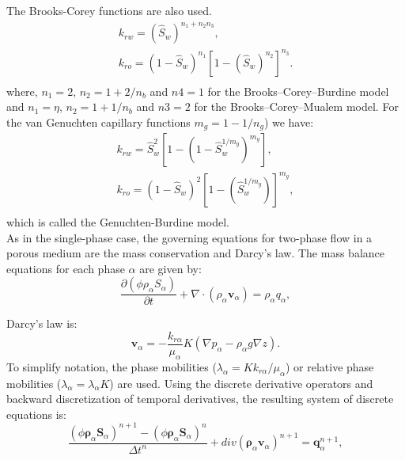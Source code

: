 \documentclass[a4paper,10pt]{report}
\begin{document}
The Brooks-Corey functions are also used. 
\begin{equation*}
\begin{aligned}
k_{rw}=(\hat{S}_w)^{n_1+n_2n_3},\\
k_{ro}=(1-\hat{S}_w)^{n_1}[1-(\hat{S}_w)^{n_2}]^{n_3}.\\
\end{aligned}
\end{equation*}
where, $n_1 = 2$, $n_2 = 1 + 2/n_b$ and $n4 = 1$ for the Brooks–Corey–Burdine model and $n_1 = \eta$, $n_2 = 1 + 1/n_b$ and $n3 = 2$ for the Brooks–Corey–Mualem model. For the van Genuchten capillary functions $m_g = 1 − 1/n_g$) we have:
\begin{equation*}
\begin{aligned}
k_{rw}=\hat{S}_w^2[1-(1-\hat{S}_w^{1/m_g})^{m_g}],\\
k_{ro}=(1-\hat{S}_w)^2[1-(\hat{S}_w^{1/m_g})]^{m_g},\\
\end{aligned}
\end{equation*}
which is called the Genuchten-Burdine model.\\
As in the single-phase case, the governing equations for two-phase flow in a porous medium are the mass 
conservation and Darcy's law. 
The mass balance equations for each phase $\alpha$ are given by:
\begin{equation*}
 \frac{\partial(\phi \rho_{\alpha}S_{\alpha})}{\partial t}+\nabla \cdot ( \rho_{\alpha} \mathbf{v}_{\alpha})=\rho_{\alpha} q_{\alpha},
\end{equation*}

Darcy's law is:
\begin{equation*}
\mathbf{v}_{\alpha}=-\frac{k_{r\alpha}}{\mu_{\alpha}} {K}(\nabla p_{\alpha}-\rho_{\alpha} g \nabla z).
\end{equation*}
To simplify notation, the phase mobilities ($\lambda_{\alpha}=Kk_{r\alpha}/\mu_{\alpha}$) or relative phase mobilities ($\lambda_{\alpha}=\lambda_{\alpha}K$) are used. 
Using the discrete derivative operators and backward discretization of temporal derivatives, the resulting system of discrete equations is:
\begin{equation*}
 \frac{(\phi \mathbf{\rho}_{\alpha}\mathbf{S}_{\alpha})^{n+1}-(\phi \mathbf{\rho}_{\alpha}\mathbf{S}_{\alpha})^{n}}{\Delta t^n}+div  ( \mathbf{\rho}_{\alpha} \mathbf{v}_{\alpha})^{n+1}= \mathbf{q}_{\alpha}^{n+1},
\end{equation*}
\end{document}
